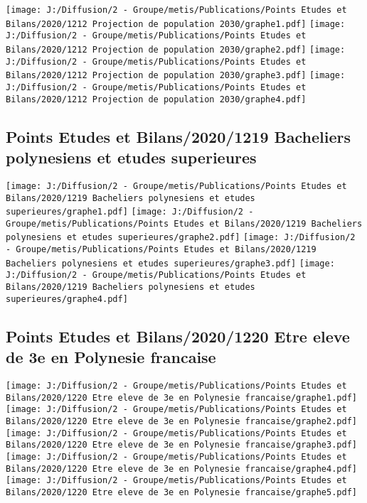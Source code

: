 \documentclass[
]{article}
\begin{document}
\texttt{[image: J:/Diffusion/2 - Groupe/metis/Publications/Points Etudes et Bilans/2020/1212 Projection de population 2030/graphe1.pdf]}
\texttt{[image: J:/Diffusion/2 - Groupe/metis/Publications/Points Etudes et Bilans/2020/1212 Projection de population 2030/graphe2.pdf]}
\texttt{[image: J:/Diffusion/2 - Groupe/metis/Publications/Points Etudes et Bilans/2020/1212 Projection de population 2030/graphe3.pdf]}
\texttt{[image: J:/Diffusion/2 - Groupe/metis/Publications/Points Etudes et Bilans/2020/1212 Projection de population 2030/graphe4.pdf]}

\hypertarget{points-etudes-et-bilans20201219-bacheliers-polynesiens-et-etudes-superieures}{%
\subsection{Points Etudes et Bilans/2020/1219 Bacheliers polynesiens et
etudes
superieures}\label{points-etudes-et-bilans20201219-bacheliers-polynesiens-et-etudes-superieures}}

\texttt{[image: J:/Diffusion/2 - Groupe/metis/Publications/Points Etudes et Bilans/2020/1219 Bacheliers polynesiens et etudes superieures/graphe1.pdf]}
\texttt{[image: J:/Diffusion/2 - Groupe/metis/Publications/Points Etudes et Bilans/2020/1219 Bacheliers polynesiens et etudes superieures/graphe2.pdf]}
\texttt{[image: J:/Diffusion/2 - Groupe/metis/Publications/Points Etudes et Bilans/2020/1219 Bacheliers polynesiens et etudes superieures/graphe3.pdf]}
\texttt{[image: J:/Diffusion/2 - Groupe/metis/Publications/Points Etudes et Bilans/2020/1219 Bacheliers polynesiens et etudes superieures/graphe4.pdf]}

\hypertarget{points-etudes-et-bilans20201220-etre-eleve-de-3e-en-polynesie-francaise}{%
\subsection{Points Etudes et Bilans/2020/1220 Etre eleve de 3e en
Polynesie
francaise}\label{points-etudes-et-bilans20201220-etre-eleve-de-3e-en-polynesie-francaise}}

\texttt{[image: J:/Diffusion/2 - Groupe/metis/Publications/Points Etudes et Bilans/2020/1220 Etre eleve de 3e en Polynesie francaise/graphe1.pdf]}
\texttt{[image: J:/Diffusion/2 - Groupe/metis/Publications/Points Etudes et Bilans/2020/1220 Etre eleve de 3e en Polynesie francaise/graphe2.pdf]}
\texttt{[image: J:/Diffusion/2 - Groupe/metis/Publications/Points Etudes et Bilans/2020/1220 Etre eleve de 3e en Polynesie francaise/graphe3.pdf]}
\texttt{[image: J:/Diffusion/2 - Groupe/metis/Publications/Points Etudes et Bilans/2020/1220 Etre eleve de 3e en Polynesie francaise/graphe4.pdf]}
\texttt{[image: J:/Diffusion/2 - Groupe/metis/Publications/Points Etudes et Bilans/2020/1220 Etre eleve de 3e en Polynesie francaise/graphe5.pdf]}
\end{document}
